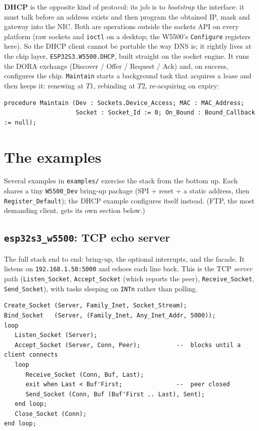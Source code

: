 \textbf{DHCP} is the opposite kind of protocol: its job is to \emph{bootstrap} the
interface: it must talk before an address exists and then program the obtained
IP, mask and gateway into the NIC. Both are operations outside the sockets API on
every platform (raw sockets and \texttt{ioctl} on a desktop; the W5500's
\texttt{Configure} registers here). So the DHCP client cannot be portable the way
DNS is; it rightly lives at the chip layer, \texttt{ESP32S3.W5500.DHCP}, built
straight on the socket engine. It runs the DORA exchange (Discover / Offer /
Request / Ack) and, on success, configures the chip. \texttt{Maintain} starts a
background task that acquires a lease and then keeps it: renewing at $T1$,
rebinding at $T2$, re-acquiring on expiry:

\begin{lstlisting}
procedure Maintain (Dev : Sockets.Device_Access; MAC : MAC_Address;
                    Socket : Socket_Id := 0; On_Bound : Bound_Callback := null);
\end{lstlisting}

\section{The examples}
\label{ch:net:examples}

Several examples in \texttt{examples/} exercise the stack from the bottom up. Each
shares a tiny \texttt{W5500\_Dev} bring-up package (SPI + reset + a static address,
then \texttt{Register\_Default}); the DHCP example configures itself instead. (FTP,
the most demanding client, gets its own section below.)

\subsection{\texttt{esp32s3\_w5500}: TCP echo server}

The full stack end to end: bring-up, the optional interrupts, and the facade. It
listens on \texttt{192.168.1.50:5000} and echoes each line back. This is the TCP
\emph{server} path (\texttt{Listen\_Socket}, \texttt{Accept\_Socket} (which
reports the peer), \texttt{Receive\_Socket}, \texttt{Send\_Socket}), with tasks
sleeping on \texttt{INTn} rather than polling.

\begin{lstlisting}
Create_Socket (Server, Family_Inet, Socket_Stream);
Bind_Socket   (Server, (Family_Inet, Any_Inet_Addr, 5000));
loop
   Listen_Socket (Server);
   Accept_Socket (Server, Conn, Peer);          --  blocks until a client connects
   loop
      Receive_Socket (Conn, Buf, Last);
      exit when Last < Buf'First;               --  peer closed
      Send_Socket (Conn, Buf (Buf'First .. Last), Sent);
   end loop;
   Close_Socket (Conn);
end loop;
\end{lstlisting}


